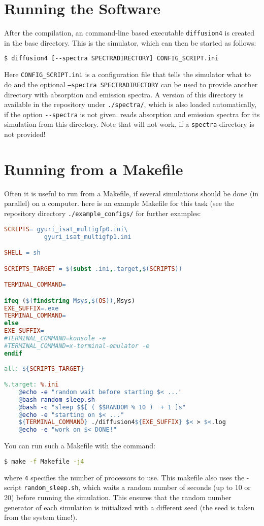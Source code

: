 \section{Running the Software \df}
\label{sec:RunningTheSoftware}
After the compilation, an command-line based executable \texttt{diffusion4} is created in the base directory. This is the simulator, which can then be started as follows:
\begin{lstlisting}[language=bash] 
$ diffusion4 [--spectra SPECTRADIRECTORY] CONFIG_SCRIPT.ini 
\end{lstlisting}
Here \texttt{CONFIG\_SCRIPT.ini} is a configuration file that tells the simulator what to do and the optional \texttt{--spectra SPECTRADIRECTORY} can be used to provide another directory with absorption and emission spectra. A version of this directory is available in the repository under \verb!./spectra/!, which is also loaded automatically, if the option \verb!--spectra! is not given. \df reads absorption and emission spectra for its simulation from this directory. Note that \df will not work, if a \texttt{spectra}-directory is not provided!

\section{Running \df from a Makefile}
\label{sec:RunningDfFromAMakefile}
Often it is useful to run \df from a Makefile, if several simulations should be done (in parallel) on a computer. here is an example Makefile for this task (see the repository directory \texttt{./example\_configs/} for further examples:
\begin{lstlisting}[language=make] 
SCRIPTS= gyuri_isat_multigfp0.ini\
	       gyuri_isat_multigfp1.ini 

SHELL = sh

SCRIPTS_TARGET = $(subst .ini,.target,$(SCRIPTS))

TERMINAL_COMMAND=		

ifeq ($(findstring Msys,$(OS)),Msys)
EXE_SUFFIX=.exe
TERMINAL_COMMAND=
else
EXE_SUFFIX=
#TERMINAL_COMMAND=konsole -e 
#TERMINAL_COMMAND=x-terminal-emulator -e 
endif		
		 
all: ${SCRIPTS_TARGET}

%.target: %.ini
	@echo -e "random wait before starting $< ..."
	@bash random_sleep.sh
	@bash -c "sleep $$[ ( $$RANDOM % 10 )  + 1 ]s"
	@echo -e "starting on $< ..."
	${TERMINAL_COMMAND} ./diffusion4${EXE_SUFFIX} $< > $<.log
	@echo -e "work on $< DONE!"
\end{lstlisting}
You can run such a Makefile with the command:
\begin{lstlisting}[language=bash] 
$ make -f Makefile -j4
\end{lstlisting}
where \texttt{4} specifies the number of processors to use. This makefile also uses the \bash-script \texttt{random\_sleep.sh}, which waits a random number of seconds (up to 10 or 20) before running  the simulation. This ensures that the random number generator of each simulation is initialized with a different seed (the seed is taken from the system time!).

